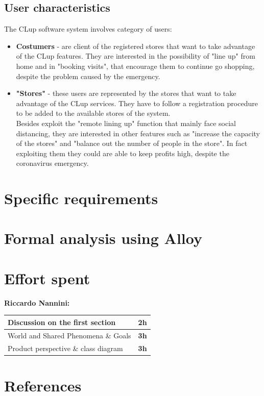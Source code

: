 \documentclass[]{article}
\begin{document}
\subsection{User characteristics}
The CLup software system involves category of users:
\begin{itemize}
	\renewcommand{\labelitemi}{$-$}
	\item \textbf{Costumers} - are client of the registered stores that want to take advantage of the CLup features. They are interested in the possibility of "line up" from home and in "booking visits", that encourage them to continue go shopping, despite the problem caused by the emergency.
	
	\item \textbf{"Stores"} - these users are represented by the stores that want to take advantage of the CLup services. They have to follow a registration procedure to be added to the available stores of the system. 
	\\Besides exploit the "remote lining up" function that mainly face social distancing, they are interested in other features such as "increase the capacity of the stores" and "balance out the number of people in the store". In fact exploiting them they could are able to keep profits high, despite the coronavirus emergency. 		
\end{itemize}


		
		
	
	\section{Specific requirements}
	\section{Formal analysis using Alloy}
	\section{Effort spent}
	\textbf{\large Riccardo Nannini:} \\ \newline
		\begin{tabular}{|l|c|}
			\hline
			Discussion on the first section &  \textbf{2h} \\ \hline
			\rowcolor[HTML]{DCDCDC} 
			World and Shared Phenomena \& Goals & \textbf{3h} \\ \hline
			Product perspective \& class diagram & \textbf{3h} \\ \hline
		\end{tabular}
	
	\section{References}				
	
\end{document}
